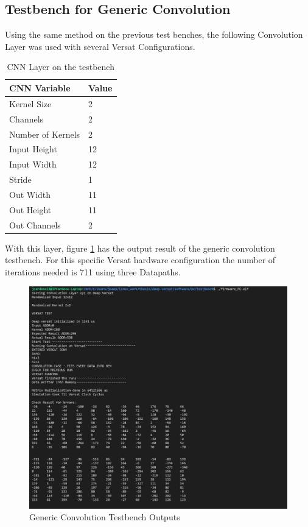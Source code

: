 \subsection{Testbench for Generic Convolution}

Using the same method on the previous test benches, the following Convolution Layer was used
with several Versat Configurations.

\begin{table}[!htpb]
    \centering
    \begin{tabular}{ll}
    \hline
    \textbf{CNN Variable} & \textbf{Value}        \\ \hline
    Kernel Size            & 2                 \\
    Channels            & 2                       \\
    Number of Kernels            & 2                       \\
    Input Height                  & 12                        \\
    Input Width                & 12                  \\
    Stride              & 1                     \\
    Out Width               & 11                      \\
    Out Height            & 11  \\
    Out Channels                   & 2                     \\ \hline
    \end{tabular}
    \label{table:convInput}
    \caption{CNN Layer on the testbench}
\end{table}

With this layer, figure \ref{figure:test3} has the output result of the generic convolution testbench.
For this specific Versat hardware configuration the number of iterations needed is 711 using three  Datapaths.

\begin{figure}[!htbp]
    \centering
    \includegraphics[width=\textwidth]{Figures/test3.png}
    \caption{Generic Convolution Testbench Outputs}
    \label{figure:test3}
\end{figure}

